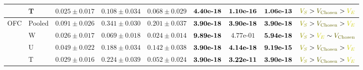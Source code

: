 \documentclass[pdflatex,sn-mathphys-num]{sn-jnl}%
\begin{document}
\begin{table}[p]
\begin{tabular*}{\textwidth}{@{\extracolsep{\fill}}llccccccc@{}}
  & T & $0.025 \pm  0.017$ & $0.108 \pm  0.034$ & $0.068 \pm  0.029$ & $\text{\bfseries \mbox{4.40e-18}}$ & $\text{\bfseries \mbox{1.10e-16}}$ & $\text{\bfseries \mbox{1.06e-13}}$ & $\textcolor{valueS}{V_S} > \textcolor{valueChosen}{V_{\mathrm{Chosen}}} > \textcolor{valueE}{V_E}$ \\
\midrule
OFC & Pooled & $0.091 \pm  0.026$ & $0.341 \pm  0.030$ & $0.201 \pm  0.037$ & $\text{\bfseries \mbox{3.90e-18}}$ & $\text{\bfseries \mbox{3.90e-18}}$ & $\text{\bfseries \mbox{3.90e-18}}$ & $\textcolor{valueS}{V_S} > \textcolor{valueChosen}{V_{\mathrm{Chosen}}} > \textcolor{valueE}{V_E}$ \\
  & W & $0.026 \pm  0.017$ & $0.069 \pm  0.018$ & $0.024 \pm  0.014$ & $\text{\bfseries \mbox{9.89e-18}}$ & $\mbox{4.77e-01}$ & $\text{\bfseries \mbox{5.94e-18}}$ & $\textcolor{valueS}{V_S} > \textcolor{valueE}{V_E} \sim \textcolor{valueChosen}{V_{\mathrm{Chosen}}}$ \\
  & U & $0.049 \pm  0.022$ & $0.188 \pm  0.034$ & $0.142 \pm  0.038$ & $\text{\bfseries \mbox{3.90e-18}}$ & $\text{\bfseries \mbox{4.14e-18}}$ & $\text{\bfseries \mbox{9.19e-15}}$ & $\textcolor{valueS}{V_S} > \textcolor{valueChosen}{V_{\mathrm{Chosen}}} > \textcolor{valueE}{V_E}$ \\
  & T & $0.029 \pm  0.016$ & $0.224 \pm  0.039$ & $0.052 \pm  0.024$ & $\text{\bfseries \mbox{3.90e-18}}$ & $\text{\bfseries \mbox{3.22e-11}}$ & $\text{\bfseries \mbox{3.90e-18}}$ & $\textcolor{valueS}{V_S} > \textcolor{valueChosen}{V_{\mathrm{Chosen}}} > \textcolor{valueE}{V_E}$ \\
\bottomrule\end{tabular*}\endgroup
\vspace{5mm}


\end{table}
\end{document}
